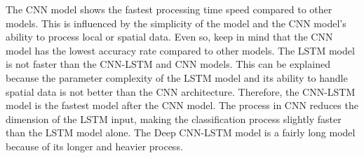 The CNN model shows the fastest processing time speed compared to other models. This is influenced by the simplicity of the model and the CNN model's ability to process local or spatial data. Even so, keep in mind that the CNN model has the lowest accuracy rate compared to other models. The LSTM model is not faster than the CNN-LSTM and CNN models. This can be explained because the parameter complexity of the LSTM model and its ability to handle spatial data is not better than the CNN architecture. Therefore, the CNN-LSTM model is the fastest model after the CNN model. The process in CNN reduces the dimension of the LSTM input, making the classification process slightly faster than the LSTM model alone. The Deep CNN-LSTM model is a fairly long model because of its longer and heavier process.



